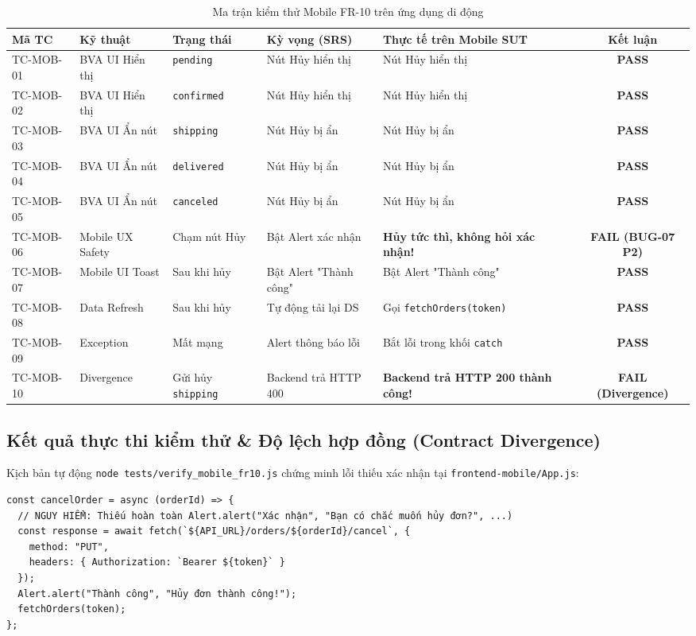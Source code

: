 \documentclass[11pt,a4paper]{article}
\begin{document}
\begin{table}[h]
\centering
\footnotesize
\begin{tabularx}{\textwidth}{l L{2.2cm} L{1.8cm} L{3cm} Y c}
\toprule
\textbf{Mã TC} & \textbf{Kỹ thuật} & \textbf{Trạng thái} & \textbf{Kỳ vọng (SRS)} & \textbf{Thực tế trên Mobile SUT} & \textbf{Kết luận} \\
\midrule
TC-MOB-01 & BVA UI Hiển thị & \texttt{pending} & Nút Hủy hiển thị & Nút Hủy hiển thị & \textbf{PASS} \\
TC-MOB-02 & BVA UI Hiển thị & \texttt{confirmed} & Nút Hủy hiển thị & Nút Hủy hiển thị & \textbf{PASS} \\
TC-MOB-03 & BVA UI Ẩn nút & \texttt{shipping} & Nút Hủy bị ẩn & Nút Hủy bị ẩn & \textbf{PASS} \\
TC-MOB-04 & BVA UI Ẩn nút & \texttt{delivered} & Nút Hủy bị ẩn & Nút Hủy bị ẩn & \textbf{PASS} \\
TC-MOB-05 & BVA UI Ẩn nút & \texttt{canceled} & Nút Hủy bị ẩn & Nút Hủy bị ẩn & \textbf{PASS} \\
TC-MOB-06 & Mobile UX Safety & Chạm nút Hủy & Bật Alert xác nhận & \textbf{Hủy tức thì, không hỏi xác nhận!} & \textbf{\color{darkred}FAIL (BUG-07 P2)} \\
TC-MOB-07 & Mobile UI Toast & Sau khi hủy & Bật Alert "Thành công" & Bật Alert "Thành công" & \textbf{PASS} \\
TC-MOB-08 & Data Refresh & Sau khi hủy & Tự động tải lại DS & Gọi \texttt{fetchOrders(token)} & \textbf{PASS} \\
TC-MOB-09 & Exception & Mất mạng & Alert thông báo lỗi & Bắt lỗi trong khối \texttt{catch} & \textbf{PASS} \\
TC-MOB-10 & Divergence & Gửi hủy \texttt{shipping} & Backend trả HTTP 400 & \textbf{Backend trả HTTP 200 thành công!} & \textbf{\color{darkred}FAIL (Divergence)} \\
\bottomrule
\end{tabularx}
\caption{Ma trận kiểm thử Mobile FR-10 trên ứng dụng di động}
\end{table}

\subsection{Kết quả thực thi kiểm thử \& Độ lệch hợp đồng (Contract Divergence)}
Kịch bản tự động \texttt{node tests/verify\_mobile\_fr10.js} chứng minh lỗi thiếu xác nhận tại \texttt{frontend-mobile/App.js}:
\begin{lstlisting}[caption={Hàm cancelOrder trong App.js thiếu bước xác nhận người dùng}]
const cancelOrder = async (orderId) => {
  // NGUY HIỂM: Thiếu hoàn toàn Alert.alert("Xác nhận", "Bạn có chắc muốn hủy đơn?", ...)
  const response = await fetch(`${API_URL}/orders/${orderId}/cancel`, {
    method: "PUT",
    headers: { Authorization: `Bearer ${token}` }
  });
  Alert.alert("Thành công", "Hủy đơn thành công!");
  fetchOrders(token);
};
\end{lstlisting}
\end{document}
